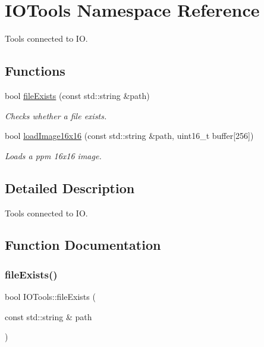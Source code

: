 \hypertarget{namespaceIOTools}{}\section{I\+O\+Tools Namespace Reference}
\label{namespaceIOTools}


Tools connected to IO.  


\subsection*{Functions}
\begin{DoxyCompactItemize}
\item 
bool \mbox{\hyperlink{namespaceIOTools_a60e05eba5733bd6f46f2800267c9217b}{file\+Exists}} (const std\+::string \&path)
\begin{DoxyCompactList}\small\item\em Checks whether a file exists. \end{DoxyCompactList}\item 
bool \mbox{\hyperlink{namespaceIOTools_a16f1ccfbedc7a4a792ffcbf3d8f0a148}{load\+Image16x16}} (const std\+::string \&path, uint16\+\_\+t buffer\mbox{[}256\mbox{]})
\begin{DoxyCompactList}\small\item\em Loads a ppm 16x16 image. \end{DoxyCompactList}\end{DoxyCompactItemize}


\subsection{Detailed Description}
Tools connected to IO. 

\subsection{Function Documentation}
\mbox{\label{namespaceIOTools_a60e05eba5733bd6f46f2800267c9217b}} 
\subsubsection{\texorpdfstring{file\+Exists()}{fileExists()}}
{\footnotesize\ttfamily bool I\+O\+Tools\+::file\+Exists (\begin{DoxyParamCaption}\item[{const std\+::string \&}]{path }\end{DoxyParamCaption})}



